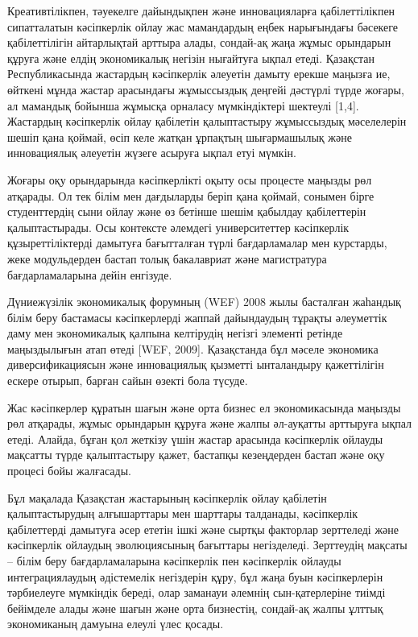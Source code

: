 Креативтілікпен, тәуекелге дайындықпен және инновацияларға
қабілеттілікпен сипатталатын кәсіпкерлік ойлау жас мамандардың еңбек
нарығындағы бәсекеге қабілеттілігін айтарлықтай арттыра алады, сондай-ақ
жаңа жұмыс орындарын құруға және елдің экономикалық негізін нығайтуға
ықпал етеді. Қазақстан Республикасында жастардың кәсіпкерлік әлеуетін
дамыту ерекше маңызға ие, өйткені мұнда жастар арасындағы жұмыссыздық
деңгейі дәстүрлі түрде жоғары, ал мамандық бойынша жұмысқа орналасу
мүмкіндіктері шектеулі {[}1,4{]}. Жастардың кәсіпкерлік ойлау қабілетін
қалыптастыру жұмыссыздық мәселелерін шешіп қана қоймай, өсіп келе жатқан
ұрпақтың шығармашылық және инновациялық әлеуетін жүзеге асыруға ықпал
етуі мүмкін.

Жоғары оқу орындарында кәсіпкерлікті оқыту осы процесте маңызды рөл
атқарады. Ол тек білім мен дағдыларды беріп қана қоймай, сонымен бірге
студенттердің сыни ойлау және өз бетінше шешім қабылдау қабілеттерін
қалыптастырады. Осы контексте әлемдегі университеттер кәсіпкерлік
құзыреттіліктерді дамытуға бағытталған түрлі бағдарламалар мен
курстарды, жеке модульдерден бастап толық бакалавриат және магистратура
бағдарламаларына дейін енгізуде.

Дүниежүзілік экономикалық форумның (WEF) 2008 жылы басталған жаһандық
білім беру бастамасы кәсіпкерлерді жаппай дайындаудың тұрақты әлеуметтік
даму мен экономикалық қалпына келтірудің негізгі элементі ретінде
маңыздылығын атап өтеді {[}WEF, 2009{]}. Қазақстанда бұл мәселе
экономика диверсификациясын және инновациялық қызметті ынталандыру
қажеттілігін ескере отырып, барған сайын өзекті бола түсуде.

Жас кәсіпкерлер құратын шағын және орта бизнес ел экономикасында маңызды
рөл атқарады, жұмыс орындарын құруға және жалпы әл-ауқатты арттыруға
ықпал етеді. Алайда, бұған қол жеткізу үшін жастар арасында кәсіпкерлік
ойлауды мақсатты түрде қалыптастыру қажет, бастапқы кезеңдерден бастап
және оқу процесі бойы жалғасады.

Бұл мақалада Қазақстан жастарының кәсіпкерлік ойлау қабілетін
қалыптастырудың алғышарттары мен шарттары талданады, кәсіпкерлік
қабілеттерді дамытуға әсер ететін ішкі және сыртқы факторлар зерттеледі
және кәсіпкерлік ойлаудың эволюциясының бағыттары негізделеді.
Зерттеудің мақсаты -- білім беру бағдарламаларына кәсіпкерлік пен
кәсіпкерлік ойлауды интеграциялаудың әдістемелік негіздерін құру, бұл
жаңа буын кәсіпкерлерін тәрбиелеуге мүмкіндік береді, олар заманауи
әлемнің сын-қатерлеріне тиімді бейімделе алады және шағын және орта
бизнестің, сондай-ақ жалпы ұлттық экономиканың дамуына елеулі үлес
қосады.

